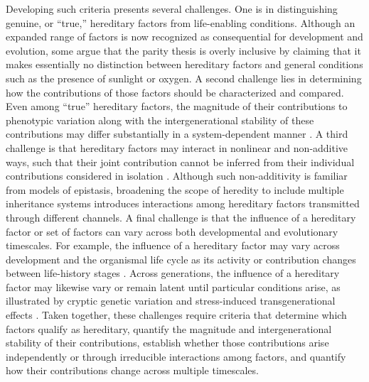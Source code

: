 \documentclass[pdflatex,sn-mathphys-num]{sn-jnl}
\theoremstyle{thmstylethree}
\theoremstyle{thmstyleone}
\begin{document}
Developing such criteria presents several challenges. One is in distinguishing genuine, or “true,” hereditary factors from life-enabling conditions. Although an expanded range of factors is now recognized as consequential for development and evolution, some \cite{pontarotti2015extended, shea2007representation, levy2011information} argue that the parity thesis is overly inclusive by claiming that it makes essentially no distinction between hereditary factors and general conditions such as the presence of sunlight or oxygen. A second challenge lies in determining how the contributions of those factors should be characterized and compared. Even among “true” hereditary factors, the magnitude of their contributions to phenotypic variation along with the intergenerational stability of these contributions may differ substantially in a system-dependent manner \cite{moore2019mothers,yang2020msh1,shahmohamadloo2025transgenerational}. A third challenge is that hereditary factors may interact in nonlinear and non-additive ways, such that their joint contribution cannot be inferred from their individual contributions considered in isolation \cite{jablonka2019systemic,martinez2018multimodal}. Although such non-additivity is familiar from models of epistasis, broadening the scope of heredity to include multiple inheritance systems introduces interactions among hereditary factors transmitted through different channels. A final challenge is that the influence of a hereditary factor or set of factors can vary across both developmental and evolutionary timescales. For example, the influence of a hereditary factor may vary across development and the organismal life cycle as its activity or contribution changes between life-history stages \cite{bober1991muscle,gutzwiller2015dynamics,todorov2024stage}. Across generations, the influence of a hereditary factor may likewise vary or remain latent until particular conditions arise, as illustrated by cryptic genetic variation \cite{paaby2014cryptic} and stress-induced transgenerational effects \cite{saavedra2013chronic}. Taken together, these challenges require criteria that determine which factors qualify as hereditary, quantify the magnitude and intergenerational stability of their contributions, establish whether those contributions arise independently or through irreducible interactions among factors, and quantify how their contributions change across multiple timescales.
\end{document}
